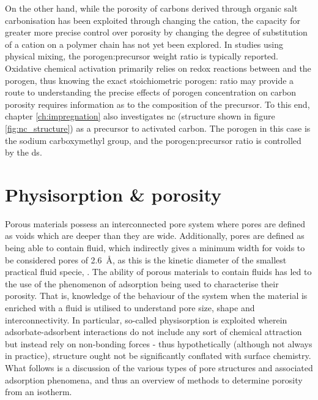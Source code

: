On the other hand, while the porosity of carbons derived through organic salt carbonisation has been exploited through changing the cation,\citep{Sevilla2013general, Tsumura2014Structure, Ferrero2015Mesoporous, Ferrero2016Efficient, Fuertes2015Hierarchical, Roberts2015Hierarchically, Yadav20123D, Yang2018Spontaneous} the capacity for greater more precise control over porosity by changing the degree of substitution of a cation on a polymer chain has not yet been explored. In studies using physical mixing, the \gls{porogen}:precursor weight ratio is typically reported.\citep{Altwala2020Predictable, Adeniran2015Compactivation, Blankenship2017Cigarette, Sevilla2016green, Ludwinowicz2015Potassium, Deng2015Inspired, Alhamed2015Preparation, Hu2003simple} Oxidative chemical activation primarily relies on redox reactions between  and the \gls{porogen}, thus knowing the exact stoichiometric  \gls{porogen}: ratio may provide a route to understanding the precise effects of \gls{porogen} concentration on carbon porosity requires information as to the composition of the precursor. To this end, chapter \ref{ch:impregnation} also investigates \acrfull{nc} (structure shown in figure \ref{fig:nc_structure}) as a precursor to activated carbon. The \gls{porogen} in this case is the sodium carboxymethyl group, and the \gls{porogen}:precursor ratio is controlled by the \acrfull{ds}.

\section{Physisorption \& porosity}
\label{s:adsorption_porosity}
Porous materials possess an interconnected pore system where pores are defined as voids which are deeper than they are wide.\citep{mcnaught1997compendium, Thommes2015Physisorption} Additionally, pores are defined as being able to contain fluid, which indirectly gives a minimum width for voids to be considered pores of \qty{2.6}{\angstrom}, as this is the kinetic diameter of the smallest practical fluid specie, .\citep{Thommes2015Physisorption, Lide2007Handbook} The ability of porous materials to contain fluids has led to the use of the phenomenon of adsorption being used to characterise their porosity. That is, knowledge of the behaviour of the system when the material is enriched with a fluid is utilised to understand pore size, shape and interconnectivity. In particular, so-called \gls{physisorption} is exploited wherein \gls{adsorbate}-\gls{adsorbent} interactions do not include any sort of chemical attraction but instead rely on non-bonding forces\citep{Thommes2015Physisorption} - thus hypothetically (although not always in practice), structure ought not be significantly conflated with surface chemistry. What follows is a discussion of the various types of pore structures and associated adsorption phenomena, and thus an overview of methods to determine porosity from an isotherm.

